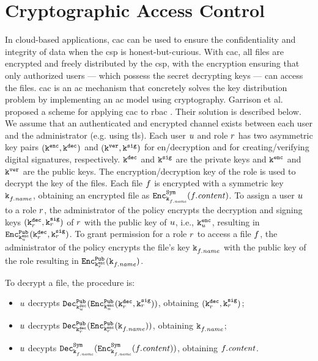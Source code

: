 \section{Cryptographic Access Control}
\label{sec:background.cac}

In cloud-based applications, \gls{cac} can be used to ensure the confidentiality and integrity of data when the \gls{csp} is honest-but-curious. With \gls{cac}, all files are encrypted and freely distributed by the \gls{csp}, with the encryption ensuring that only authorized users --- which possess the secret decrypting keys --- can access the files. \Gls{cac} is an \gls{ac} mechanism that concretely solves the key distribution problem by implementing an \gls{ac} model using cryptography.
Garrison et al. proposed a scheme for applying \gls{cac} to \gls{rbac} \cite{cac}.
Their solution is described below. We assume that an authenticated and encrypted channel exists between each user and the administrator (e.g. using \gls{tls}). Each user \( u \) and role \( r \) has two asymmetric key pairs \( (\mathtt{k}^{\mathtt{enc}}_{}, \mathtt{k}^{\mathtt{dec}}_{}) \) and \( (\mathtt{k}^{\mathtt{ver}}_{}, \mathtt{k}^{\mathtt{sig}}_{}) \) for en/decryption and for creating/verifying digital signatures, respectively. \( \mathtt{k}^{\mathtt{dec}}_{} \) and \( \mathtt{k}^{\mathtt{sig}}_{} \) are the private keys and \( \mathtt{k}^{\mathtt{enc}}_{} \) and \( \mathtt{k}^{\mathtt{ver}}_{} \) are the public keys. 
The encryption/decryption key of the role is used to decrypt the key of the files.
Each file \( f \) is encrypted with a symmetric key \( \mathtt{k}^{}_{f.\mathit{name}} \), obtaining an encrypted file as \( \mathtt{Enc}^{\mathtt{Sym}}_{\mathtt{k}^{}_{f.\mathit{name}}}(f.\mathit{content}) \). To assign a user \( u \) to a role \( r \), the administrator of the policy encrypts the decryption and signing keys \( (\mathtt{k}^{\mathtt{dec}}_{r}, \mathtt{k}^{\mathtt{sig}}_{r}) \) of \( r \) with the public key of \( u \), i.e., \( \mathtt{k}^{\mathtt{enc}}_{u} \), resulting in \( \mathtt{Enc}^{\mathtt{Pub}}_{\mathtt{k}^{\mathtt{enc}}_{u}}(\mathtt{k}^{\mathtt{dec}}_{r}, \mathtt{k}^{\mathtt{sig}}_{r}) \). To grant permission for a role \( r \) to access a file \( f \), the administrator of the policy encrypts the file's key \( \mathtt{k}^{}_{f.\mathit{name}} \) with the public key of the role resulting in \( \mathtt{Enc}^{\mathtt{Pub}}_{\mathtt{k}^{\mathtt{enc}}_{r}}(\mathtt{k}^{}_{f.\mathit{name}}) \). 

To decrypt a file, the procedure is:
\begin{itemize}
	\item \( u \) decrypts \( \mathtt{Dec}^{\mathtt{Pub}}_{\mathtt{k}^{\mathtt{dec}}_{u}}(\mathtt{Enc}^{\mathtt{Pub}}_{\mathtt{k}^{\mathtt{enc}}_{u}}(\mathtt{k}^{\mathtt{dec}}_{r}, \mathtt{k}^{\mathtt{sig}}_{r})) \), obtaining \( (\mathtt{k}^{\mathtt{dec}}_{r}, \mathtt{k}^{\mathtt{sig}}_{r}) \);
	\item \( u \) decrypts \( \mathtt{Dec}^{\mathtt{Pub}}_{\mathtt{k}^{\mathtt{dec}}_{r}}(\mathtt{Enc}^{\mathtt{Pub}}_{\mathtt{k}^{\mathtt{enc}}_{r}}(\mathtt{k}^{}_{f.\mathit{name}})) \), obtaining \( \mathtt{k}^{}_{f.\mathit{name}} \);
	\item \( u \) decypts \( \mathtt{Dec}^{\mathtt{Sym}}_{\mathtt{k}^{}_{f.\mathit{name}}}(\mathtt{Enc}^{\mathtt{Sym}}_{\mathtt{k}^{}_{f.\mathit{name}}}(f.\mathit{content})) \), obtaining \( f.\mathit{content} \).
\end{itemize}

